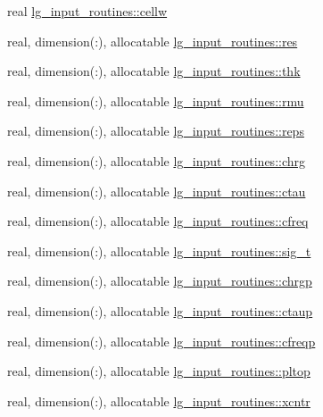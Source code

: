 \begin{DoxyCompactItemize}
\item 
real \hyperlink{namespacelg__input__routines_a5aaa08577983b3738ea36301b56c0410}{lg\+\_\+input\+\_\+routines\+::cellw}
\item 
real, dimension(\+:), allocatable \hyperlink{namespacelg__input__routines_ae3a8a91ea2d57c11242ff73731b2c9e9}{lg\+\_\+input\+\_\+routines\+::res}
\item 
real, dimension(\+:), allocatable \hyperlink{namespacelg__input__routines_a199d87b93f3f5ab8b25fcd0640c45b7d}{lg\+\_\+input\+\_\+routines\+::thk}
\item 
real, dimension(\+:), allocatable \hyperlink{namespacelg__input__routines_a6ea167ba918b3575bd7587145486068b}{lg\+\_\+input\+\_\+routines\+::rmu}
\item 
real, dimension(\+:), allocatable \hyperlink{namespacelg__input__routines_af61c1a97123787059f666eb146880b2e}{lg\+\_\+input\+\_\+routines\+::reps}
\item 
real, dimension(\+:), allocatable \hyperlink{namespacelg__input__routines_a1653ca16fcac1be1d1e8449d3bcea089}{lg\+\_\+input\+\_\+routines\+::chrg}
\item 
real, dimension(\+:), allocatable \hyperlink{namespacelg__input__routines_ac8bb200fd8bf044a20d5445759fab02c}{lg\+\_\+input\+\_\+routines\+::ctau}
\item 
real, dimension(\+:), allocatable \hyperlink{namespacelg__input__routines_aa9fa43a162e95877320d121ab31b958d}{lg\+\_\+input\+\_\+routines\+::cfreq}
\item 
real, dimension(\+:), allocatable \hyperlink{namespacelg__input__routines_a3faaed94e2a40a7d19af4bf0b4e9f8cf}{lg\+\_\+input\+\_\+routines\+::sig\+\_\+t}
\item 
real, dimension(\+:), allocatable \hyperlink{namespacelg__input__routines_a05b7b31b77371774e886aadf410be79e}{lg\+\_\+input\+\_\+routines\+::chrgp}
\item 
real, dimension(\+:), allocatable \hyperlink{namespacelg__input__routines_a4ca057c77a03e564a388368be839cd43}{lg\+\_\+input\+\_\+routines\+::ctaup}
\item 
real, dimension(\+:), allocatable \hyperlink{namespacelg__input__routines_a39583b1655c1a6964d1e80639879060b}{lg\+\_\+input\+\_\+routines\+::cfreqp}
\item 
real, dimension(\+:), allocatable \hyperlink{namespacelg__input__routines_ad8ae00121fa40a63aab71d92b83d5506}{lg\+\_\+input\+\_\+routines\+::pltop}
\item 
real, dimension(\+:), allocatable \hyperlink{namespacelg__input__routines_ab251caca089824152c534b93625579db}{lg\+\_\+input\+\_\+routines\+::xcntr}

\end{DoxyCompactItemize}
